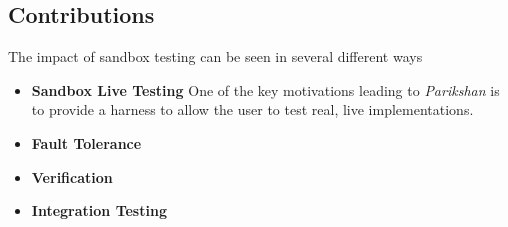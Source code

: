 \subsection{Contributions}
\label{sec:contributions}

The impact of sandbox testing can be seen in several different ways

\begin{itemize}
  \item \textbf{Sandbox Live Testing}
    One of the key motivations leading to \emph{Parikshan} is to provide a harness to allow the user to test real, live implementations. 


  \item \textbf{Fault Tolerance}
  \item \textbf{Verification}
  \item \textbf{Integration Testing}
\end{itemize}
